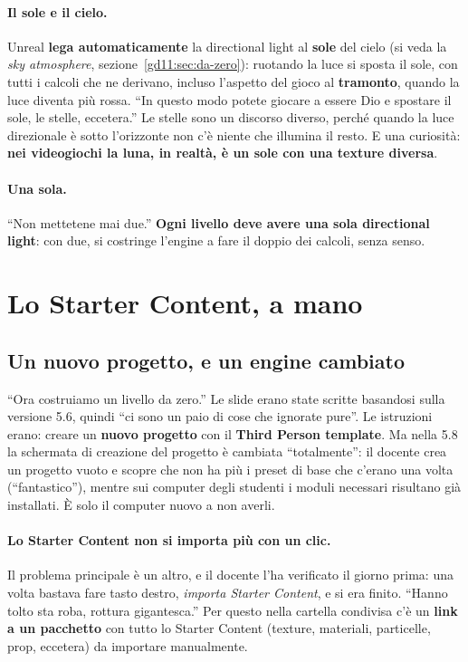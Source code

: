 \paragraph{Il sole e il cielo.} Unreal \textbf{lega automaticamente} la
directional light al \textbf{sole} del cielo (si veda la \emph{sky atmosphere},
sezione~\ref{gd11:sec:da-zero}): ruotando la luce si sposta il sole, con tutti
i calcoli che ne derivano, incluso l'aspetto del gioco al \textbf{tramonto},
quando la luce diventa più rossa. ``In questo modo potete giocare a essere Dio e
spostare il sole, le stelle, eccetera.'' Le stelle sono un discorso diverso,
perché quando la luce direzionale è sotto l'orizzonte non c'è niente che
illumina il resto. E una curiosità: \textbf{nei videogiochi la luna, in realtà,
è un sole con una texture diversa}.

\paragraph{Una sola.} ``Non mettetene mai due.'' \textbf{Ogni livello deve avere
una sola directional light}: con due, si costringe l'engine a fare il doppio dei
calcoli, senza senso.

\section{Lo Starter Content, a mano}
\label{gd11:sec:starter}

\subsection{Un nuovo progetto, e un engine cambiato}

``Ora costruiamo un livello da zero.'' Le slide erano state scritte basandosi
sulla versione 5.6, quindi ``ci sono un paio di cose che ignorate pure''. Le
istruzioni erano: creare un \textbf{nuovo progetto} con il \textbf{Third Person
template}. Ma nella 5.8 la schermata di creazione del progetto è cambiata
``totalmente'': il docente crea un progetto vuoto e scopre che non ha più i
preset di base che c'erano una volta (``fantastico''), mentre sui computer degli
studenti i moduli necessari risultano già installati. È solo il computer nuovo a
non averli.

\paragraph{Lo Starter Content non si importa più con un clic.} Il problema
principale è un altro, e il docente l'ha verificato il giorno prima: una volta
bastava fare tasto destro, \emph{importa Starter Content}, e si era finito.
``Hanno tolto sta roba, rottura gigantesca.'' Per questo nella cartella
condivisa c'è un \textbf{link a un pacchetto} con tutto lo Starter Content
(texture, materiali, particelle, prop, eccetera) da importare manualmente.

